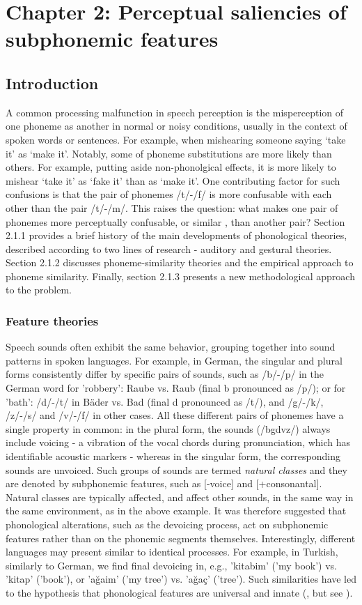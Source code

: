 \chapter{Chapter 2: Perceptual saliencies of subphonemic features}
\section{Introduction}
A common processing malfunction in speech perception is the misperception of one phoneme as another in normal or noisy conditions, usually in the context of spoken words or sentences. For example, when mishearing someone saying ‘take it’ as ‘make it’. Notably, some of phoneme substitutions are more likely than others. For example, putting aside non-phonolgical effects, it is more likely to mishear ‘take it’ as ‘fake it’ than as ‘make it’. One contributing factor for such confusions is that the pair of phonemes /t/-/f/ is more confusable with each other than the pair /t/-/m/. This raises the question: what makes one pair of phonemes more perceptually confusable, or similar \citep{Tversky1977, Shepard1987}, than another pair? Section 2.1.1 provides a brief history of the main developments of phonological theories, described according to two lines of research - auditory and gestural theories. Section 2.1.2 discusses phoneme-similarity theories and the empirical approach to phoneme similarity. Finally, section 2.1.3 presents a new methodological approach to the problem.  

\subsection{Feature theories}
Speech sounds often exhibit the same behavior, grouping together into sound patterns in spoken languages. For example, in German, the singular and plural forms consistently differ by specific pairs of sounds, such as /b/-/p/ in the German word for 'robbery': Raube vs. Raub (final b pronounced as /p/); or for 'bath': /d/-/t/ in  Bäder  vs. Bad (final d pronounced as /t/), and /g/-/k/, /z/-/s/ and /v/-/f/ in other cases. All these different pairs of phonemes have a single property in common: in the plural form, the sounds (/bgdvz/) always include voicing - a vibration of the vocal chords during pronunciation, which has identifiable acoustic markers - whereas in the singular form, the corresponding sounds are unvoiced. Such groups of sounds are termed \textit{natural classes} and they are denoted by subphonemic features, such as [-voice] and [+consonantal]. Natural classes are typically affected, and affect other sounds, in the same way in the same environment, as in the above example. It was therefore suggested that phonological alterations, such as the devoicing process, act on subphonemic features rather than on the phonemic segments themselves. Interestingly, different languages may present similar to identical processes. For example, in Turkish, similarly to German, we find final devoicing in, e.g., 'kitabim' ('my book') vs. 'kitap' ('book'), or 'a\u{g}aim' ('my tree') vs. 'a\u{g}a\c{c}' ('tree'). Such similarities have led to the hypothesis that phonological features are universal and innate (\citealp{ChomskyHalle1968}, but see \citealp{mielke2008emergence}).

